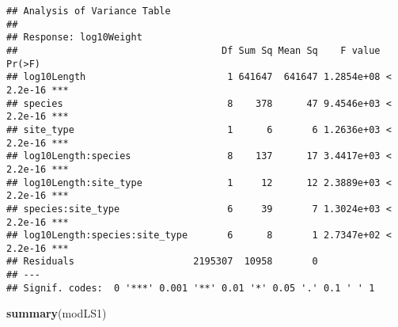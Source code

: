 \documentclass[
  landscape]{article}
\newenvironment{Shaded}{\begin{snugshade}}{\end{snugshade}}
\newcommand{\KeywordTok}[1]{\textcolor[rgb]{0.13,0.29,0.53}{\textbf{#1}}}
\newcommand{\NormalTok}[1]{#1}
\begin{document}
\begin{verbatim}
## Analysis of Variance Table
## 
## Response: log10Weight
##                                    Df Sum Sq Mean Sq    F value    Pr(>F)    
## log10Length                         1 641647  641647 1.2854e+08 < 2.2e-16 ***
## species                             8    378      47 9.4546e+03 < 2.2e-16 ***
## site_type                           1      6       6 1.2636e+03 < 2.2e-16 ***
## log10Length:species                 8    137      17 3.4417e+03 < 2.2e-16 ***
## log10Length:site_type               1     12      12 2.3889e+03 < 2.2e-16 ***
## species:site_type                   6     39       7 1.3024e+03 < 2.2e-16 ***
## log10Length:species:site_type       6      8       1 2.7347e+02 < 2.2e-16 ***
## Residuals                     2195307  10958       0                         
## ---
## Signif. codes:  0 '***' 0.001 '**' 0.01 '*' 0.05 '.' 0.1 ' ' 1
\end{verbatim}

\begin{Shaded}
\begin{Highlighting}[]
\KeywordTok{summary}\NormalTok{(modLS1)}
\end{Highlighting}
\end{Shaded}
\end{document}
